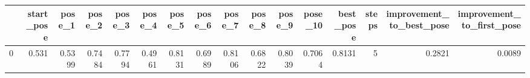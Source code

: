 \begin{tabular}{lrrrrrrrrrrrrrrr}
\toprule
{} &  start\_pose &  pose\_1 &  pose\_2 &  pose\_3 &  pose\_4 &  pose\_5 &  pose\_6 &  pose\_7 &  pose\_8 &  pose\_9 &  pose\_10 &  best\_pose &  steps &  improvement\_to\_best\_pose &  improvement\_to\_first\_pose \\
\midrule
0 &       0.531 &  0.5399 &  0.7484 &  0.7794 &  0.4961 &  0.8131 &  0.6989 &  0.8106 &  0.6822 &  0.8039 &   0.7064 &     0.8131 &      5 &                    0.2821 &                     0.0089 \\
\bottomrule
\end{tabular}
